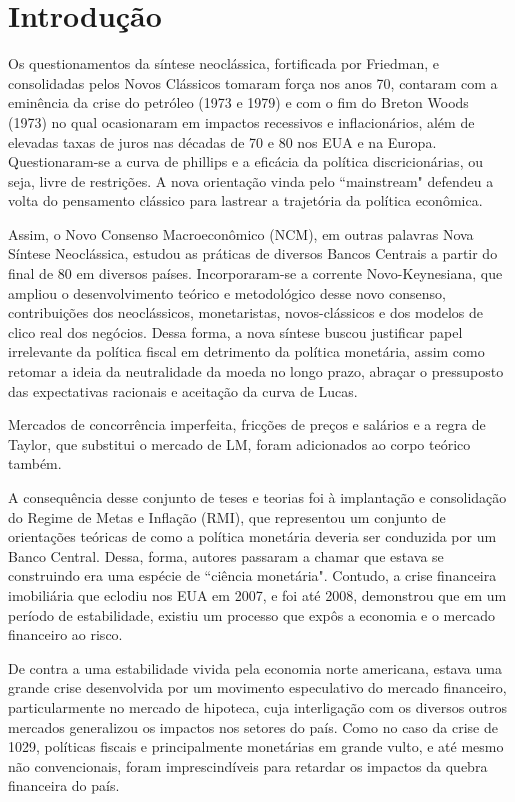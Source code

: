 \documentclass[report]{uftex}
\begin{document}
\section{Introdução}

Os questionamentos da síntese neoclássica, fortificada por Friedman, e consolidadas pelos Novos Clássicos tomaram força nos anos 70, contaram com a eminência da crise do petróleo (1973 e 1979) e com o fim do Breton Woods (1973) no qual ocasionaram em impactos recessivos e inflacionários, além de elevadas taxas de juros nas décadas de 70 e 80 nos EUA e na Europa. Questionaram-se a curva de phillips e a eficácia da política discricionárias, ou seja, livre de restrições. A nova orientação vinda pelo ``mainstream" defendeu a volta do pensamento clássico para lastrear a trajetória da política econômica. 

Assim, o Novo Consenso Macroeconômico (NCM), em outras palavras Nova Síntese Neoclássica, estudou as práticas de diversos Bancos Centrais a partir do final de 80 em diversos países. Incorporaram-se a corrente Novo-Keynesiana, que ampliou o desenvolvimento teórico e metodológico desse novo consenso, contribuições dos neoclássicos, monetaristas, novos-clássicos e dos modelos de clico real dos negócios. Dessa forma, a nova síntese buscou justificar papel irrelevante da política fiscal em detrimento da política monetária, assim como retomar a ideia da neutralidade da moeda no longo prazo, abraçar o pressuposto das expectativas racionais e aceitação da curva de Lucas.

Mercados de concorrência imperfeita, fricções de preços e salários e a regra de Taylor, que substitui o mercado de LM, foram adicionados ao corpo teórico também.

A consequência desse conjunto de teses e teorias foi à implantação e consolidação do Regime de Metas e Inflação (RMI), que representou um conjunto de orientações teóricas de como a política monetária deveria ser conduzida por um Banco Central. Dessa, forma, autores passaram a chamar que estava se construindo era uma espécie de ``ciência monetária". Contudo, a crise financeira imobiliária que eclodiu nos EUA em 2007, e foi até 2008, demonstrou que em um período de estabilidade, existiu um processo que expôs a economia e o mercado financeiro ao risco.

De contra a uma estabilidade vivida pela economia norte americana, estava uma grande crise desenvolvida por um movimento especulativo do mercado financeiro, particularmente no mercado de hipoteca, cuja interligação com os diversos outros mercados generalizou os impactos nos setores do país. Como no caso da crise de 1029, políticas fiscais e principalmente monetárias em grande vulto, e até mesmo não convencionais, foram imprescindíveis para retardar os impactos da quebra financeira do país.
\end{document}
